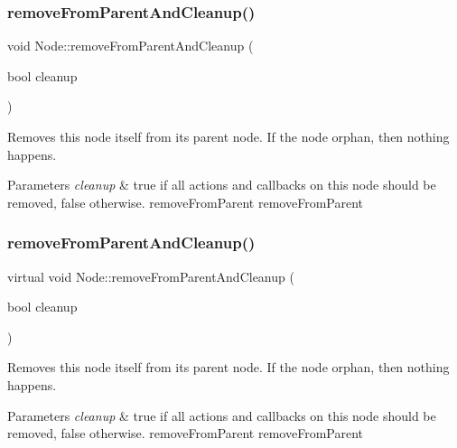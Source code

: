 \subsubsection{\texorpdfstring{remove\+From\+Parent\+And\+Cleanup()}{removeFromParentAndCleanup()}\hspace{0.1cm}{\footnotesize\ttfamily [1/2]}}
{\footnotesize\ttfamily void Node\+::remove\+From\+Parent\+And\+Cleanup (\begin{DoxyParamCaption}\item[{bool}]{cleanup }\end{DoxyParamCaption})\hspace{0.3cm}{\ttfamily [virtual]}}

Removes this node itself from its parent node. If the node orphan, then nothing happens. 
\begin{DoxyParams}{Parameters}
{\em cleanup} & true if all actions and callbacks on this node should be removed, false otherwise.  remove\+From\+Parent  remove\+From\+Parent \\
\hline
\end{DoxyParams}
\mbox{\label{classNode_ab22d0fe060ea35fba5eee6fe2fba5f42}} 
\subsubsection{\texorpdfstring{remove\+From\+Parent\+And\+Cleanup()}{removeFromParentAndCleanup()}\hspace{0.1cm}{\footnotesize\ttfamily [2/2]}}
{\footnotesize\ttfamily virtual void Node\+::remove\+From\+Parent\+And\+Cleanup (\begin{DoxyParamCaption}\item[{bool}]{cleanup }\end{DoxyParamCaption})\hspace{0.3cm}{\ttfamily [virtual]}}

Removes this node itself from its parent node. If the node orphan, then nothing happens. 
\begin{DoxyParams}{Parameters}
{\em cleanup} & true if all actions and callbacks on this node should be removed, false otherwise.  remove\+From\+Parent  remove\+From\+Parent \\
\hline
\end{DoxyParams}
\mbox{\label{classNode_a5c9bc72e7f53c1e7f0ef6bc87c07a08f}} 
